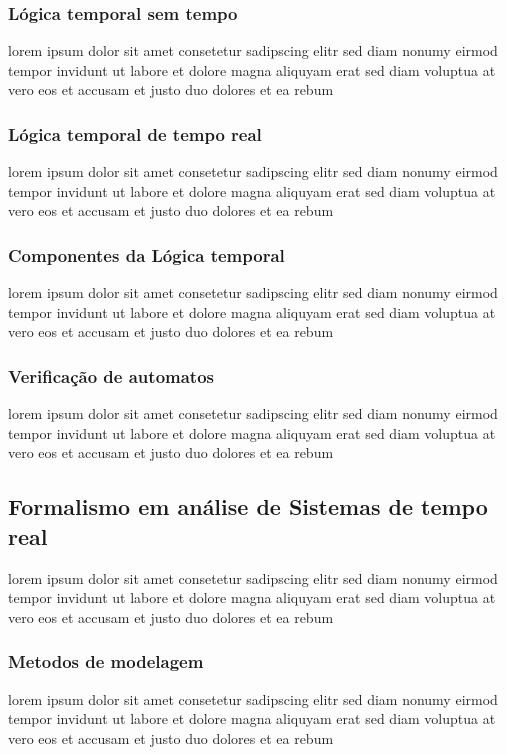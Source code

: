 \subsubsection{Lógica temporal sem tempo}
lorem ipsum dolor sit amet consetetur sadipscing elitr sed diam nonumy
eirmod tempor invidunt ut labore et dolore magna aliquyam erat sed diam
voluptua at vero eos et accusam et justo duo dolores et ea rebum

\subsubsection{Lógica temporal de tempo real}
lorem ipsum dolor sit amet consetetur sadipscing elitr sed diam nonumy
eirmod tempor invidunt ut labore et dolore magna aliquyam erat sed diam
voluptua at vero eos et accusam et justo duo dolores et ea rebum

\subsubsection{Componentes da Lógica temporal}
lorem ipsum dolor sit amet consetetur sadipscing elitr sed diam nonumy
eirmod tempor invidunt ut labore et dolore magna aliquyam erat sed diam
voluptua at vero eos et accusam et justo duo dolores et ea rebum

\subsubsection{Verificação de automatos}
lorem ipsum dolor sit amet consetetur sadipscing elitr sed diam nonumy
eirmod tempor invidunt ut labore et dolore magna aliquyam erat sed diam
voluptua at vero eos et accusam et justo duo dolores et ea rebum


\subsection{Formalismo em análise de Sistemas de tempo real}
lorem ipsum dolor sit amet consetetur sadipscing elitr sed diam nonumy
eirmod tempor invidunt ut labore et dolore magna aliquyam erat sed diam
voluptua at vero eos et accusam et justo duo dolores et ea rebum

\subsubsection{Metodos de modelagem}
lorem ipsum dolor sit amet consetetur sadipscing elitr sed diam nonumy
eirmod tempor invidunt ut labore et dolore magna aliquyam erat sed diam
voluptua at vero eos et accusam et justo duo dolores et ea rebum

